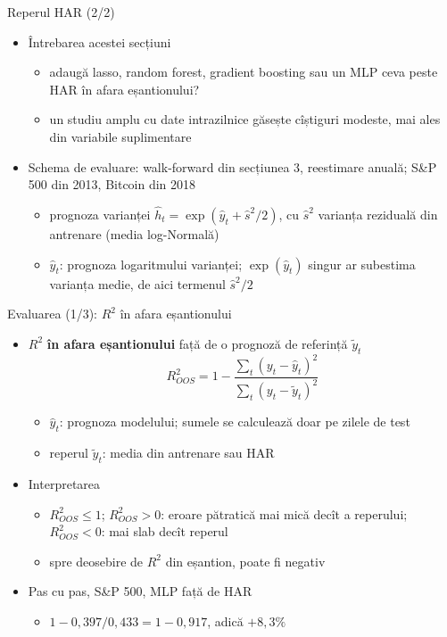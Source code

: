 \begin{frame}{Reperul HAR (2/2)}
\itemsize{\small}
\begin{itemize}
    \item Întrebarea acestei secțiuni
    \begin{itemize}
        \item adaugă lasso, random forest, gradient boosting sau un MLP ceva peste HAR în afara eșantionului?
        \item un studiu amplu cu date intrazilnice găsește cîștiguri modeste, mai ales din variabile suplimentare 
    \end{itemize}
    \item Schema de evaluare: walk-forward din secțiunea 3, reestimare anuală; S\&P 500 din 2013, Bitcoin din 2018
    \begin{itemize}
        \item prognoza varianței $\hat h_t = \exp(\hat y_t + \hat s^2/2)$, cu $\hat s^2$ varianța reziduală din antrenare (media log-Normală)
        \item $\hat y_t$: prognoza logaritmului varianței; $\exp(\hat y_t)$ singur ar subestima varianța medie, de aici termenul $\hat s^2/2$
    \end{itemize}
\end{itemize}
\end{frame}

\begin{frame}{Evaluarea (1/3): $R^2$ în afara eșantionului}
\itemsize{\small}
\begin{itemize}
    \item $R^2$ \textbf{în afara eșantionului} față de o prognoză de referință $\tilde y_t$  \[ R^2_{OOS} = 1 - \frac{\sum_t (y_t - \hat y_t)^2}{\sum_t (y_t - \tilde y_t)^2} \]
    \begin{itemize}
        \item $\hat y_t$: prognoza modelului; sumele se calculează doar pe zilele de test
        \item reperul $\tilde y_t$: media din antrenare sau HAR
    \end{itemize}
    \item Interpretarea
    \begin{itemize}
        \item $R^2_{OOS} \le 1$; $R^2_{OOS} > 0$: eroare pătratică mai mică decît a reperului; $R^2_{OOS} < 0$: mai slab decît reperul
        \item spre deosebire de $R^2$ din eșantion, poate fi negativ
    \end{itemize}
    \item Pas cu pas, S\&P 500, MLP față de HAR
    \begin{itemize}
        \item $1 - 0{,}397/0{,}433 = 1 - 0{,}917$, adică $+8{,}3\%$
    \end{itemize}
\end{itemize}
\end{frame}

